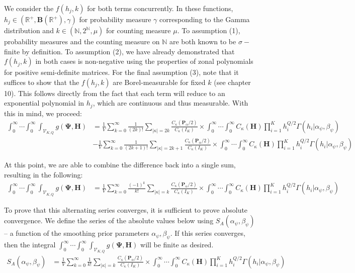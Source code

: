 \documentclass[12pt]{article}
\begin{document}
We consider the $f(h_j, k)$ for both terms concurrently. In these functions, $h_j \in (\mathbb{R}^+, \mathbf{B}(\mathbb{R}^+), \gamma)$ for probability measure $\gamma$ corresponding to the Gamma distribution and $k \in (\mathbb{N}, 2^{\mathbb{N}}, \mu)$ for counting measure $\mu$. To assumption (1), probability measures and the counting measure on $\mathbb{N}$ are both known to be $\sigma-$finite by definition. To assumption (2), we have already demonstrated that $f(h_j, k)$ in both cases is non-negative using the properties of zonal polynomials for positive semi-definite matrices. For the final assumption (3), note that it suffices to show that the $f(h_j, k)$ are Borel-measurable for fixed $k$ (see \cite{bartle_product_1995} chapter 10). This follows directly from the fact that each term will reduce to an exponential polynomial in $h_j$, which are continuous and thus measurable. With this in mind, we proceed:
\begin{align*}
     \int_0^{\infty} \cdots \int_0^\infty \int_{\mathcal{V}_{K,Q}} g(\boldsymbol{\Psi}, \mathbf{H}) & = \frac{1}{V} \sum_{k = 0}^\infty \frac{1}{(2k)!} \sum_{|\kappa| = 2k} \frac{C_\kappa(\mathbf{P}_\alpha/2)}{C_\kappa(I_K)} \times \int_0^\infty \cdots \int_0^\infty C_\kappa(\mathbf{H})\prod_{i = 1}^K h_i^{Q/2} \Gamma(h_i| \alpha_\psi, \beta_\psi)\\
    & - \frac{1}{V} \sum_{k = 0}^\infty \frac{1}{(2k+1)!} \sum_{|\kappa| = 2k+1} \frac{C_\kappa(\mathbf{P}_\alpha/2)}{C_\kappa(I_K)} \times \int_0^\infty \cdots \int_0^\infty C_\kappa(\mathbf{H})\prod_{i = 1}^K h_i^{Q/2} \Gamma(h_i| \alpha_\psi, \beta_\psi)
\end{align*}

At this point, we are able to combine the difference back into a single sum, resulting in the following:
\begin{align*}
    \int_0^{\infty} \cdots \int_0^\infty \int_{\mathcal{V}_{K,Q}} g(\boldsymbol{\Psi}, \mathbf{H}) & = \frac{1}{V} \sum_{k = 0}^\infty \frac{(-1)^k}{k!} \sum_{|\kappa| = k} \frac{C_\kappa(\mathbf{P}_\alpha/2)}{C_\kappa(I_K)} \times \int_0^\infty \cdots \int_0^\infty C_\kappa(\mathbf{H})\prod_{i = 1}^K h_i^{Q/2} \Gamma(h_i| \alpha_\psi, \beta_\psi)
\end{align*}

To prove that this alternating series converges, it is sufficient to prove absolute convergence. We define the series of the absolute values below using $S_A(\alpha_\psi, \beta_\psi)$ -- a function of the smoothing prior parameters $\alpha_\psi, \beta_\psi$. If this series converges, then the integral $\int_0^{\infty} \cdots \int_0^\infty \int_{\mathcal{V}_{K,Q}} g(\boldsymbol{\Psi}, \mathbf{H})$ will be finite as desired.
\begin{align*}
    S_A(\alpha_\psi, \beta_\psi) & = \frac{1}{V} \sum_{k = 0}^\infty \frac{1}{k!} \sum_{|\kappa| = k} \frac{C_\kappa(\mathbf{P}_\alpha/2)}{C_\kappa(I_K)} \times \int_0^\infty \cdots \int_0^\infty C_\kappa(\mathbf{H})\prod_{i = 1}^K h_i^{Q/2} \Gamma(h_i| \alpha_\psi, \beta_\psi)
\end{align*}
\end{document}
